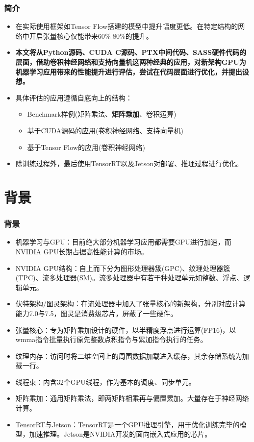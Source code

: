 \documentclass[10pt,aspectratio=169,mathserif]{beamer}
\begin{document}
	\begin{frame}
		\frametitle{简介}
		\begin{itemize}
			\item 在实际使用框架如Tensor Flow搭建的模型中提升幅度更低。在特定结构的网络中开启张量核心仅能带来60\%-80\%的提升。
			\item {\bf 本文将从Python源码、CUDA C源码、PTX中间代码、SASS硬件代码的层面，借助卷积神经网络和支持向量机这两种经典的应用，对新架构GPU为机器学习应用带来的性能提升进行评估，尝试在代码层面进行优化，并提出设想。}
			\item 具体评估的应用遵循自底向上的结构：
				\begin{itemize}
					\item Benchmark样例(矩阵乘法、\textbf{矩阵乘加}、卷积运算)
					\item 基于CUDA源码的应用(卷积神经网络、支持向量机)
					\item 基于Tensor Flow的应用(卷积神经网络)
				\end{itemize}
			\item 除训练过程外，最后使用TensorRT以及Jetson对部署、推理过程进行优化。
		\end{itemize}
	\end{frame}

	\section{背景}
	\begin{frame}
		\frametitle{背景}
		\begin{itemize}
			\item 机器学习与GPU：目前绝大部分机器学习应用都需要GPU进行加速，而NVIDIA GPU长期占据高性能计算的市场。
			\item NVIDIA GPU结构：自上而下分为图形处理器簇(GPC)、纹理处理器簇(TPC)、流多处理器(SM)。流多处理器中有若干种处理单元如整数、浮点、逻辑单元。
			\item 伏特架构/图灵架构：在流处理器中加入了张量核心的新架构，分别对应计算能力7.0与7.5，图灵是消费级芯片，屏蔽了一些硬件。
			\item 张量核心：专为矩阵乘加设计的硬件，以半精度浮点进行运算(FP16)，以wmma指令批量执行原先整数点积指令与累加指令执行的任务。
			\item 纹理内存：访问时将二维空间上的周围数据加载进入缓存，其余存储系统为加载一行。
			\item 线程束：内含32个GPU线程，作为基本的调度、同步单元。
			\item 矩阵乘加：通用矩阵乘法，即两矩阵相乘再与偏置累加。大量存在于神经网络计算。
			\item TensorRT与Jetson：TensorRT是一个GPU推理引擎，用于优化训练完毕的模型，加速推理。Jetson是NVIDIA开发的面向嵌入式应用的芯片。
		\end{itemize}
	\end{frame}
\end{document}
